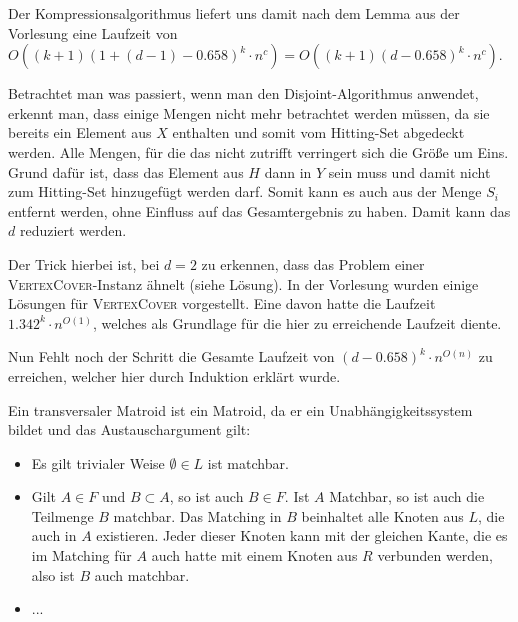 Der Kompressionsalgorithmus liefert uns damit nach dem Lemma aus der Vorlesung eine Laufzeit von $O((k+1)(1+(d-1)-0.658)^k \cdot n^c) = O((k+1)(d-0.658)^k \cdot n^c)$.


\how
Betrachtet man was passiert, wenn man den Disjoint-Algorithmus anwendet, erkennt man, dass einige Mengen nicht mehr betrachtet werden müssen, da sie bereits ein Element aus $X$ enthalten und somit vom Hitting-Set abgedeckt werden. Alle Mengen, für die das nicht zutrifft verringert sich die Größe um Eins. Grund dafür ist, dass das Element aus $H$ dann in $Y$ sein muss und damit nicht zum Hitting-Set hinzugefügt werden darf. Somit kann es auch aus der Menge $S_i$ entfernt werden, ohne Einfluss auf das Gesamtergebnis zu haben. Damit kann das $d$ reduziert werden. 

Der Trick hierbei ist, bei $d=2$ zu erkennen, dass das Problem einer \textsc{VertexCover}-Instanz ähnelt (siehe Lösung). In der Vorlesung wurden einige Lösungen für \textsc{VertexCover} vorgestellt. Eine davon hatte die Laufzeit $1.342^k \cdot n^{O(1)}$, welches als Grundlage für die hier zu erreichende Laufzeit diente.

Nun Fehlt noch der Schritt die Gesamte Laufzeit von $(d-0.658)^k \cdot n^{O(n)}$ zu erreichen, welcher hier durch Induktion erklärt wurde.



\subexercise
Ein transversaler Matroid ist ein Matroid, da er ein Unabhängigkeitssystem bildet und das Austauschargument gilt:

\begin{itemize}
\item Es gilt trivialer Weise $\emptyset \in L$ ist matchbar.

\item Gilt $A \in F$ und $B \subset A$, so ist auch $B \in F$. Ist $A$ Matchbar, so ist auch die Teilmenge $B$ matchbar. Das Matching in $B$ beinhaltet alle Knoten aus $L$, die auch in $A$ existieren. Jeder dieser Knoten kann mit der gleichen Kante, die es im Matching für $A$ auch hatte mit einem Knoten aus $R$ verbunden werden, also ist $B$ auch matchbar.

\item ...
\end{itemize}

\subexercise



